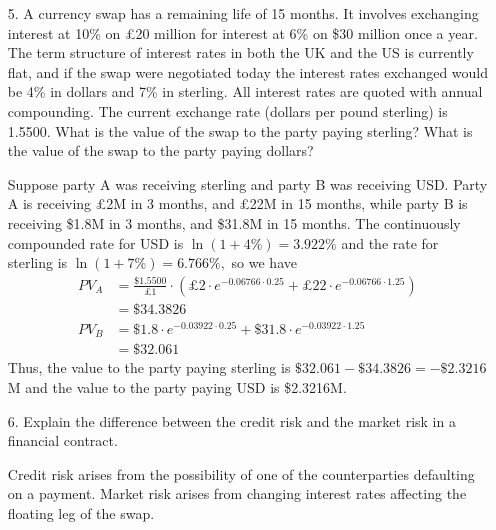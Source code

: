 \documentclass{article}
\begin{document}
\begin{itemize}
	\item[5.] A currency swap has a remaining life of 15 months. It involves exchanging interest at 10\% on \pounds20 million for interest at 6\% on \$30 million once a year. The term structure of interest rates in both the UK and the US is currently flat, and if the swap were negotiated today the interest rates exchanged would be 4\% in dollars and 7\% in sterling. All interest rates are quoted with annual compounding. The current exchange rate (dollars per pound sterling) is 1.5500. What is the value of the swap to the party paying sterling? What is the value of the swap to the party paying dollars?
		\begin{soln}
			Suppose party A was receiving sterling and party B was receiving USD. Party A is receiving \pounds2M in 3 months, and \pounds22M in 15 months, while party B is receiving \$1.8M in 3 months, and \$31.8M in 15 months. The continuously compounded rate for USD is $\ln(1+4\%)=3.922\%$ and the rate for sterling is $\ln(1+7\%)=6.766\%,$ so we have
			\begin{align*}
				PV_A &= \frac{\$1.5500}{\pounds1}\cdot\left( \pounds2\cdot e^{-0.06766\cdot 0.25}  + \pounds22\cdot e^{-0.06766\cdot 1.25}\right) \\
				&= \$34.3826 \\
				PV_B &= \$1.8\cdot e^{-0.03922\cdot 0.25} + \$31.8\cdot e^{-0.03922\cdot 1.25} \\
				&= \$32.061
			\end{align*}
			Thus, the value to the party paying sterling is $\$32.061-\$34.3826=-\$2.3216$M and the value to the party paying USD is \$2.3216M.
		\end{soln}

	\item[6.] Explain the difference between the credit risk and the market risk in a financial contract.
		\begin{answer*}
			Credit risk arises from the possibility of one of the counterparties defaulting on a payment. Market risk arises from changing interest rates affecting the floating leg of the swap.
		\end{answer*}


\end{itemize}
\end{document}
